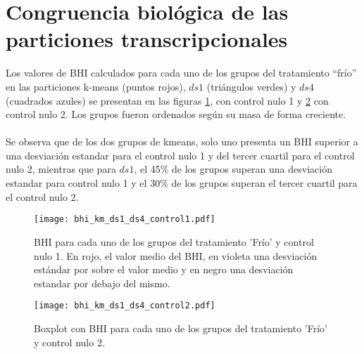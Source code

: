 \section{Congruencia biológica de las particiones transcripcionales}
Los valores de BHI calculados para cada uno de los grupos del tratamiento ``frío'' en las particiones k-means (puntos rojos), $ds1$ (triángulos verdes) y $ds4$ (cuadrados azules) se presentan en las figuras \ref{fig:bhi_km_ds1_ds4_control1}, con control nulo 1 y \ref{fig:bhi_km_ds1_ds4_control2} con control nulo 2. Los grupos fueron ordenados según su masa de forma creciente.\\\\
Se observa que de los dos grupos de kmeans, solo uno presenta un BHI superior a una desviación estandar para el control nulo 1 y del tercer cuartil para el control nulo 2, mientras que para $ds1$, el 45\% de los grupos superan una desviación estandar para control nulo 1 y el 30\% de los grupos superan el tercer cuartil para el control nulo 2.\\
\begin{figure*}[t!]
    \centering
    \begin{subfigure}[t]{0.7\textwidth}
    \centering
    \texttt{[image: bhi\_km\_ds1\_ds4\_control1.pdf]}
    \caption{BHI para cada uno de los grupos del tratamiento 'Frío' y control nulo 1. En rojo, el valor medio del BHI, en violeta una desviación estándar por sobre el valor medio y en negro una desviación estandar por debajo del mismo.}
    \label{fig:bhi_km_ds1_ds4_control1}
    \end{subfigure}
    \begin{subfigure}[t]{0.7\textwidth}
    \centering
    \texttt{[image: bhi\_km\_ds1\_ds4\_control2.pdf]}
    \caption{Boxplot con BHI para cada uno de los grupos del tratamiento 'Frío' y control nulo 2.}
    \label{fig:bhi_km_ds1_ds4_control2}
    \end{subfigure}
    \caption{Índice de Homogeneidad Biológica, BHI, para cada uno de los grupos del tratamiento 'Frío' obtenidos con k-means (puntos rojos), $ds1$ (triángulos verdes), $ds4$ (cuadrados azules) y controles nulos. Los grupos fueron ordenados según su masa de forma creciente.}
\end{figure*}

